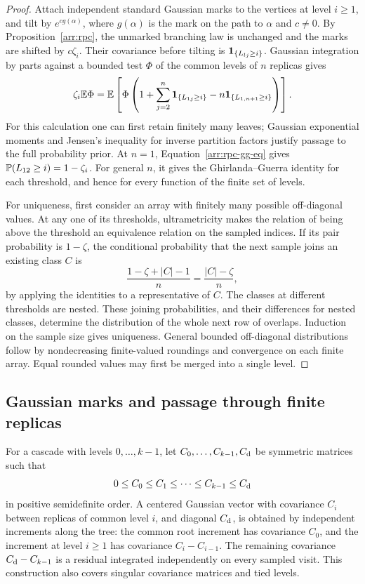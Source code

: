 \begin{proof}
Attach independent standard Gaussian marks to the vertices at level
$i\geq1$, and tilt by $e^{cg(\alpha)}$, where $g(\alpha)$ is the mark
on the path to $\alpha$ and $c\ne0$. By
Proposition~\ref{arr:rpc}, the unmarked branching law is unchanged and
the marks are shifted by $c\zeta_i$. Their covariance before tilting is
$\mathbf 1_{\{L_{lj}\geq i\}}$. Gaussian integration by parts against a
bounded test $\Phi$ of the common levels of $n$ replicas gives
\begin{equation}\label{arr:rpc-gg-eq}
 \zeta_i\mathbb E\Phi
 =\mathbb E\left[\Phi\left(1+
    \sum_{j=2}^n\mathbf 1_{\{L_{1j}\geq i\}}
    -n\mathbf 1_{\{L_{1,n+1}\geq i\}}\right)\right].
\end{equation}
For this calculation one can first retain finitely many leaves; Gaussian
exponential moments and Jensen's inequality for inverse partition
factors justify passage to the full probability prior. At $n=1$,
Equation~\eqref{arr:rpc-gg-eq} gives
$\mathbb P(L_{12}\geq i)=1-\zeta_i$. For general $n$, it gives the
Ghirlanda--Guerra identity for each threshold, and hence for every
function of the finite set of levels.

For uniqueness, first consider an array with finitely many possible
off-diagonal values. At any one of its thresholds, ultrametricity makes
the relation of being above the threshold an equivalence relation on
the sampled indices. If its pair probability is $1-\zeta$, the
conditional probability that the next sample joins an existing class
$C$ is
\[
 \frac{1-\zeta+|C|-1}{n}=\frac{|C|-\zeta}{n},
\]
by applying the identities to a representative of $C$. The classes
at different thresholds are nested. These joining probabilities, and
their differences for nested classes, determine the distribution of
the whole next row of overlaps. Induction on the sample size gives
uniqueness. General bounded off-diagonal distributions follow by
nondecreasing finite-valued roundings and convergence on each finite
array. Equal rounded values may first be merged into a single level.
\end{proof}

\subsection{Gaussian marks and passage through finite replicas}

For a cascade with levels $0,\ldots,k-1$, let
$C_0,\ldots,C_{k-1},C_{\rm d}$ be symmetric matrices such that
\[
 0\leq C_0\leq C_1\leq\cdots\leq C_{k-1}\leq C_{\rm d}
\]
in positive semidefinite order. A centered Gaussian vector with
covariance $C_i$ between replicas of common level $i$, and diagonal
$C_{\rm d}$, is obtained by independent increments along the tree:
the common root increment has covariance $C_0$, and the increment at
level $i\geq1$ has covariance $C_i-C_{i-1}$. The remaining covariance
$C_{\rm d}-C_{k-1}$ is a residual integrated independently on every
sampled visit. This construction also covers singular covariance
matrices and tied levels.

